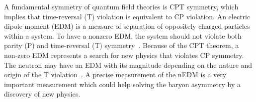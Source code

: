 A fundamental symmetry of quantum field theories is CPT symmetry, which implies that time-reversal (T) violation is equivalent to CP violation.  An electric dipole moment (EDM) is a measure of separation of oppositely charged particles within a system. To have a nonzero EDM, the system should not violate both parity (P) and time-reversal (T) symmetry~\cite{edm_reason}. Because of the CPT theorem, a non-zero EDM represents a search for new physics that violates CP symmetry. The neutron may have an EDM with its magnitude depending on the nature and origin of the T violation~\cite{nEDM_reason}. A precise measurement of the nEDM is a very important measurement which could help solving the baryon asymmetry by a discovery of new physics.






